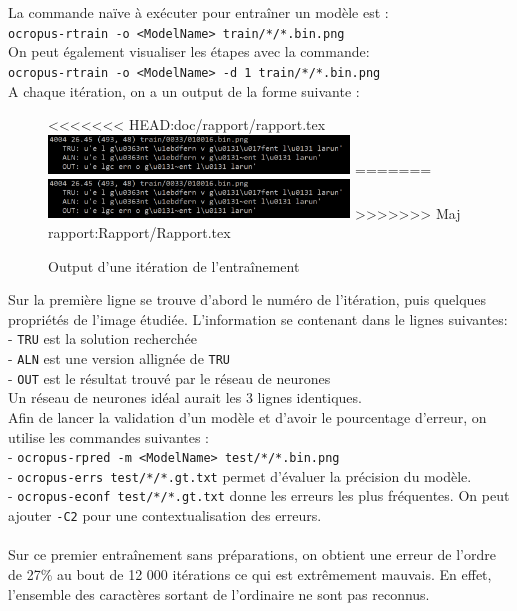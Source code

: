 \documentclass{article}
\begin{document}
La commande naïve à exécuter pour entraîner un modèle est : \\
\texttt{ocropus-rtrain -o <ModelName> train/*/*.bin.png} \\
On peut également visualiser les étapes avec la commande: \\
\texttt{ocropus-rtrain -o <ModelName> -d 1 train/*/*.bin.png} \\

\noindent A chaque itération, on a un output de la forme suivante : 

\begin{figure}[!h] 
    \center
<<<<<<< HEAD:doc/rapport/rapport.tex
    \includegraphics[width=8cm]{screen_output.png}
=======
    \includegraphics[width=8cm]{../Screenshots/screen_output.png}
>>>>>>>  Maj rapport:Rapport/Rapport.tex
    \caption{Output d'une itération de l'entraînement}
    \label{API}
\end{figure}

Sur la première ligne se trouve d'abord le numéro de l'itération, puis quelques propriétés de l'image étudiée. L'information se contenant dans le lignes suivantes: \\
- \texttt{TRU} est la solution recherchée \\
- \texttt{ALN} est une version allignée de \texttt{TRU} \\
- \texttt{OUT} est le résultat trouvé par le réseau de neurones \\
Un réseau de neurones idéal aurait les 3 lignes identiques. \\

Afin de lancer la validation d'un modèle et d'avoir le pourcentage d'erreur, on utilise les commandes suivantes : \\
- \texttt{ocropus-rpred -m <ModelName> test/*/*.bin.png} \\
- \texttt{ocropus-errs test/*/*.gt.txt} permet d'évaluer la précision du modèle. \\
- \texttt{ocropus-econf test/*/*.gt.txt} donne les erreurs les plus fréquentes.
On peut ajouter \texttt{-C2} pour une contextualisation des erreurs. \\
\\
Sur ce premier entraînement sans préparations, on obtient une erreur de l'ordre de 27\% au bout de 12 000 itérations ce qui est extrêmement mauvais. En effet, l'ensemble des caractères sortant de l'ordinaire ne sont pas reconnus.
\end{document}
